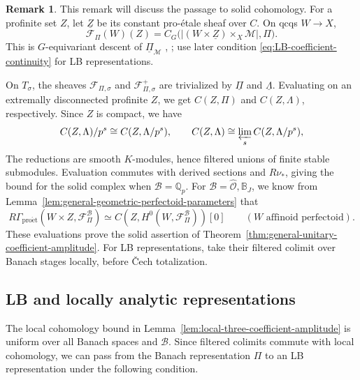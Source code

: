 \documentclass[11pt]{article}
\theoremstyle{definition}
\newtheorem{remark}[theorem]{Remark}
\newcommand{\cM}{\mathcal M}
\newcommand{\cF}{\mathcal F}
\newcommand{\proet}{\mathrm{pro\acute et}}
\begin{document}
\begin{remark}
\label{rem:solid-amplitude-tests}
This remark will discuss the passage to solid cohomology.
For a profinite set \(Z\), let \(\underline Z\) be its constant
pro-\'etale sheaf over \(C\).  On qcqs \(W\to X\),
\begin{equation*}
 \cF_\Pi(W)(Z)
 =C_G\bigl(|(W\times\underline Z)\times_X\cM|,\Pi\bigr).
\end{equation*}
This is \(G\)-equivariant descent of \(\underline \Pi_{\cM}\)
\cite[Lemma~4.4(i) and Corollary~4.5(i)]{AnschutzMannDescent},
\cite[\S7.2]{DRC}; use later condition \eqref{eq:LB-coefficient-continuity}
for LB representations.

On \(T_\sigma\), the sheaves $\cF_{\Pi, \sigma}$ and $\cF_{\Pi,\sigma}^+$ are trivialized by
\(\underline\Pi\) and \(\underline\Lambda\). Evaluating on an extremally
disconnected profinite \(Z\), we get \(C(Z,\Pi)\) and \(C(Z,\Lambda)\),
respectively. Since $Z$ is compact, we have
\begin{equation*}
 C(Z,\Lambda)/p^s
 \cong C(Z,\Lambda/p^s),
 \qquad
 C(Z,\Lambda)
 \cong\varprojlim_s C(Z,\Lambda/p^s),
\end{equation*}
The reductions are smooth \(K\)-modules, hence filtered unions
of finite stable submodules.  Evaluation commutes with derived
sections and \(R\nu_*\), giving the bound for the solid complex when $\mathscr{B}=\mathbb{Q}_p$.
For \(\mathscr B=\widehat{\mathscr O},\mathbb B_J\), we know from
Lemma~\ref{lem:general-geometric-perfectoid-parameters} that
\[
 R\Gamma_{\proet}(W\times Z,\cF_\Pi^{\mathscr B})
 \simeq C\!\left(Z,H^0(W,\cF_\Pi^{\mathscr B})\right)[0]
 \qquad(W\text{ affinoid perfectoid}).
\]
These evaluations prove the solid assertion of
Theorem~\ref{thm:general-unitary-coefficient-amplitude}.
For LB representations, take their filtered colimit over Banach stages locally, before \v Cech totalization.
\end{remark}

\subsection{LB and locally analytic representations}
\label{subsec:LB-lalg-amplitude}
The local cohomology bound in Lemma~\ref{lem:local-three-coefficient-amplitude}
is uniform over all Banach spaces and \(\mathscr B\).
Since filtered colimits commute with local cohomology, we can pass from
the Banach representation $\Pi$ to an LB representation under the following condition.
\end{document}
